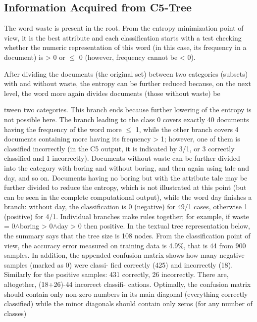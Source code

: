 \documentclass[11pt,openany,executivepaper]{book}
\begin{document}
\subsection{Information Acquired from C5-Tree}

The word waste is present in the root. From the entropy minimization point of
view, it is the best attribute and each classification starts with a test checking
whether the numeric representation of this word (in this case, its frequency in a
document) is > 0 or $\leq$ 0 (however, frequency cannot be < 0).

After dividing the documents (the original set) between two categories (subsets) with and without waste, the entropy can be further reduced because, on
the next level, the word more again divides documents (those without waste) be

tween two categories. This branch ends because further lowering of the entropy
is not possible here.
The branch leading to the class 0 covers exactly 40 documents having the
frequency of the word more $\leq$ 1, while the other branch covers 4 documents
containing more having its frequency > 1; however, one of them is classified
incorrectly (in the C5 output, it is indicated by 3/1, or 3 correctly classified and
1 incorrectly).
Documents without waste can be further divided into the category with boring and without boring, and then again using tale and day, and so on. Documents
having no boring but with the attribute tale may be further divided to reduce
the entropy, which is not illustrated at this point (but can be seen in the complete computational output), while the word day finishes a branch: without day,
the classification is 0 (negative) for 49/1 cases, otherwise 1 (positive) for 4/1.
Individual branches make rules together; for example, if waste = 0$\wedge$boring >
0$\wedge$day > 0 then positive.
In the textual tree representation below, the summary says that the tree size
is 108 nodes. From the classification point of view, the accuracy error measured
on training data is 4.9\%, that is 44 from 900 samples. In addition, the appended
confusion matrix shows how many negative samples (marked as 0) were classi-
fied correctly (425) and incorrectly (18). Similarly for the positive samples: 431
correctly, 26 incorrectly. There are, altogether, (18+26)-44 incorrect classifi-
cations. Optimally, the confusion matrix should contain only non-zero numbers
in its main diagonal (everything correctly classified) while the minor diagonals
should contain only zeros (for any number of classes)
\end{document}
